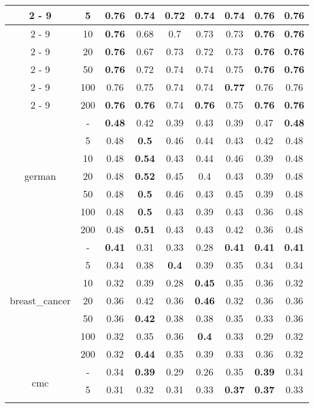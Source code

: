\documentclass{article}%
\begin{document}
\begin{longtable}{c|c|ccccccc}
\cline{2%
-%
9}%
&5&\textbf{0.76}&0.74&0.72&0.74&0.74&\textbf{0.76}&\textbf{0.76}\\%
\cline{2%
-%
9}%
&10&\textbf{0.76}&0.68&0.7&0.73&0.73&\textbf{0.76}&\textbf{0.76}\\%
\cline{2%
-%
9}%
&20&\textbf{0.76}&0.67&0.73&0.72&0.73&\textbf{0.76}&\textbf{0.76}\\%
\cline{2%
-%
9}%
&50&\textbf{0.76}&0.72&0.74&0.74&0.75&\textbf{0.76}&\textbf{0.76}\\%
\cline{2%
-%
9}%
&100&0.76&0.75&0.74&0.74&\textbf{0.77}&0.76&0.76\\%
\cline{2%
-%
9}%
&200&\textbf{0.76}&\textbf{0.76}&0.74&\textbf{0.76}&0.75&\textbf{0.76}&\textbf{0.76}\\%
\hline%
\multirow{7}{*}{german}&{-}&\textbf{0.48}&0.42&0.39&0.43&0.39&0.47&\textbf{0.48}\\%
\cline{2%
-%
9}%
&5&0.48&\textbf{0.5}&0.46&0.44&0.43&0.42&0.48\\%
\cline{2%
-%
9}%
&10&0.48&\textbf{0.54}&0.43&0.44&0.46&0.39&0.48\\%
\cline{2%
-%
9}%
&20&0.48&\textbf{0.52}&0.45&0.4&0.43&0.39&0.48\\%
\cline{2%
-%
9}%
&50&0.48&\textbf{0.5}&0.46&0.43&0.45&0.39&0.48\\%
\cline{2%
-%
9}%
&100&0.48&\textbf{0.5}&0.43&0.39&0.43&0.36&0.48\\%
\cline{2%
-%
9}%
&200&0.48&\textbf{0.51}&0.43&0.43&0.42&0.36&0.48\\%
\hline%
\multirow{7}{*}{breast\_cancer}&{-}&\textbf{0.41}&0.31&0.33&0.28&\textbf{0.41}&\textbf{0.41}&\textbf{0.41}\\%
\cline{2%
-%
9}%
&5&0.34&0.38&\textbf{0.4}&0.39&0.35&0.34&0.34\\%
\cline{2%
-%
9}%
&10&0.32&0.39&0.28&\textbf{0.45}&0.35&0.36&0.32\\%
\cline{2%
-%
9}%
&20&0.36&0.42&0.36&\textbf{0.46}&0.32&0.36&0.36\\%
\cline{2%
-%
9}%
&50&0.36&\textbf{0.42}&0.38&0.38&0.35&0.33&0.36\\%
\cline{2%
-%
9}%
&100&0.32&0.35&0.36&\textbf{0.4}&0.33&0.29&0.32\\%
\cline{2%
-%
9}%
&200&0.32&\textbf{0.44}&0.35&0.39&0.33&0.36&0.32\\%
\hline%
\multirow{7}{*}{cmc}&{-}&0.34&\textbf{0.39}&0.29&0.26&0.35&\textbf{0.39}&0.34\\%
\cline{2%
-%
9}%
&5&0.31&0.32&0.31&0.33&\textbf{0.37}&\textbf{0.37}&0.33\\%
\cline{2%
-%
9}%

\end{longtable}
\end{document}
